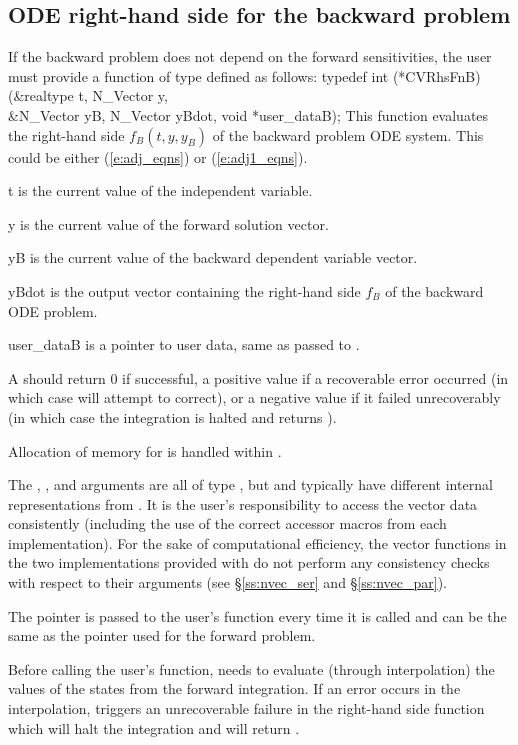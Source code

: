 \subsection{ODE right-hand side for the backward problem}\label{ss:ODErhs_b}

If the backward problem does not depend on the forward sensitivities,
the user must provide a  function of type  defined as follows:
{
  typedef int (*CVRhsFnB)(&realtype t, N\_Vector y, \\
                          &N\_Vector yB, N\_Vector yBdot, void *user\_dataB);
}
{
  This function evaluates the right-hand side $f_B(t,y,y_B)$ of the backward problem
  ODE system.  This could be either (\ref{e:adj_eqns}) or (\ref{e:adj1_eqns}).
}
{
  \begin{args}
  \item[t]
    is the current value of the independent variable.
  \item[y]
    is the current value of the forward solution vector.
  \item[yB]
    is the current value of the backward dependent variable vector.
  \item[yBdot]
    is the output vector containing the right-hand side $f_B$ of the backward ODE problem.
  \item[user\_dataB]
    is a pointer to user data, same as passed to .
  \end{args}
}
{
  A  should return 0 if successful, a positive value if a recoverable
  error occurred (in which case {\cvodes} will attempt to correct), or a negative
  value if it failed unrecoverably (in which case the integration is halted and
   returns ).
}
{
  Allocation of memory for  is handled within {\cvodes}.

  The , , and  arguments are all
  of type , but  and  typically have
  different internal representations from . It is the user's
  responsibility to access the vector data consistently (including the use of the
  correct accessor macros from each {\nvector} implementation). For the sake of
  computational efficiency, the vector functions in the two {\nvector} implementations
  provided with {\cvodes} do not perform any consistency checks with respect to their
   arguments (see \S\ref{ss:nvec_ser} and \S\ref{ss:nvec_par}).

  The  pointer is passed to
  the user's  function every time it is called and can be the same as the
   pointer used for the forward problem.

  {\warn}Before calling the user's  function, {\cvodes} needs to evaluate
  (through interpolation) the values of the states from the forward integration.
  If an error occurs in the interpolation, {\cvodes} triggers an unrecoverable
  failure in the right-hand side function which will halt the integration and
   will return .
}

